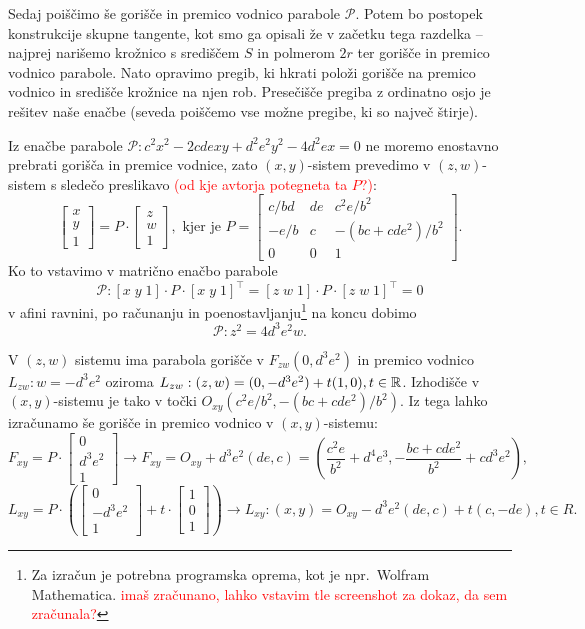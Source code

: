 Sedaj poiščimo še gorišče in premico vodnico parabole $\mathcal{P}$. Potem bo postopek konstrukcije skupne tangente, kot smo ga opisali že v začetku tega razdelka -- najprej narišemo krožnico s središčem $S$ in polmerom $2r$ ter gorišče in premico vodnico parabole. Nato opravimo pregib, ki hkrati položi gorišče na premico vodnico in središče krožnice na njen rob. Presečišče pregiba z ordinatno osjo je rešitev naše enačbe (seveda poiščemo vse možne pregibe, ki so največ štirje).

Iz enačbe parabole $\mathcal{P}: c^2x^2 - 2cdexy + d^2e^2y^2 - 4d^2ex = 0$ ne moremo enostavno prebrati gorišča in premice vodnice, zato $(x, y)$-sistem prevedimo v $(z, w)$-sistem s sledečo preslikavo \textcolor{red}{(od kje avtorja potegneta ta $P$?)}:
$$ \begin{bmatrix} x\\y\\1\end{bmatrix} = P \cdot \begin{bmatrix} z\\w\\1\end{bmatrix}, \text{ kjer je } P =
\begin{bmatrix}
    c/bd & de & c^2e/b^2\\
    -e/b & c & -(bc + cde^2)/b^2\\
    0 & 0 & 1
\end{bmatrix}.
$$
Ko to vstavimo v matrično enačbo parabole
$$\mathcal{P} : [x\;y\;1] \cdot P \cdot [x\;y\;1]^\intercal = [z\;w\;1] \cdot P \cdot [z\;w\;1]^\intercal = 0$$
v afini ravnini, po računanju in poenostavljanju\footnote{Za izračun je potrebna programska oprema, kot je npr.\ Wolfram Mathematica. \textcolor{red}{imaš zračunano, lahko vstavim tle screenshot za dokaz, da sem zračunala?}} na koncu dobimo
$$ \mathcal{P}: z^2 = 4d^3e^2w. $$

V $(z, w)$ sistemu ima parabola gorišče v $F_{zw}(0, d^3e^2)$ in premico vodnico $L_{zw}: w = - d^3e^2$ oziroma $L_{zw}: (z, w) = (0, -d^3e^2) + t(1, 0), t \in \mathbb R $. Izhodišče v $(x, y)$-sistemu je tako v točki $O_{xy} (c^2e/b^2, -(bc + cde^2)/b^2)$. Iz tega lahko izračunamo še gorišče in premico vodnico v $(x, y)$-sistemu:
$$ F_{xy} = P \cdot \begin{bmatrix} 0\\d^3e^2\\1\end{bmatrix} \longrightarrow F_{xy} = O_{xy} + d^3e^2(de, c) = (\frac{c^2e}{b^2} + d^4e^3, -\frac{bc + cde^2}{b^2} + cd^3e^2),$$
$$ L_{xy} = P \cdot \left( \begin{bmatrix} 0\\-d^3e^2\\1\end{bmatrix} + t \cdot \begin{bmatrix} 1\\0\\1\end{bmatrix} \right) \longrightarrow L_{xy}: (x, y) = O_{xy} - d^3e^2(de, c) + t(c, -de), t \in R.$$


